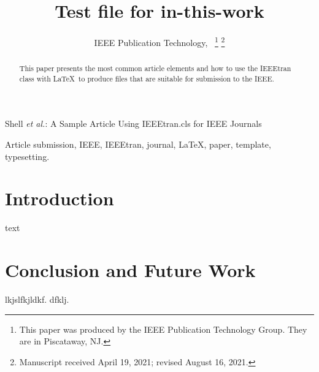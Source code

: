 \documentclass[lettersize,journal]{IEEEtran}
\begin{document}
	\title{Test file for in-this-work}

	\author{IEEE Publication Technology,~
		\thanks{This paper was produced by the IEEE Publication Technology Group. They are in Piscataway, NJ.}%
		\thanks{Manuscript received April 19, 2021; revised August 16, 2021.}}

	{Shell \MakeLowercase{\textit{et al.}}: A Sample Article Using IEEEtran.cls for IEEE Journals}


	\maketitle

	\begin{abstract}
		This paper presents the most common article elements and how to use the IEEEtran class with \LaTeX \ to produce files that are suitable for submission to the IEEE.
	\end{abstract}

	\begin{IEEEkeywords}
		Article submission, IEEE, IEEEtran, journal, \LaTeX, paper, template, typesetting.
	\end{IEEEkeywords}

	\section{Introduction}
	text

    \section{Conclusion and Future Work}
    lkjslfkjldkf.
    dfklj.
\end{document}

